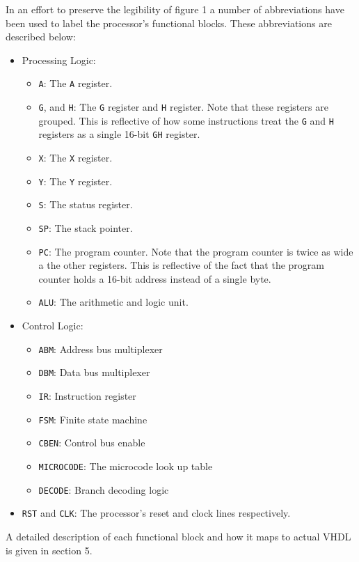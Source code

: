 \documentclass[a4paper,12pt]{article}
\newcommand{\Ar}{\texttt{A}}
\newcommand{\Gr}{\texttt{G}}
\newcommand{\Hr}{\texttt{H}}
\newcommand{\Xr}{\texttt{X}}
\newcommand{\Yr}{\texttt{Y}}
\newcommand{\Sr}{\texttt{S}}
\newcommand{\SP}{\texttt{SP}}
\newcommand{\PC}{\texttt{PC}}
\begin{document}
In an effort to preserve the legibility of figure 1 a number of abbreviations
have been used to label the processor's functional blocks. These abbreviations
are described below:
\begin{itemize}
	\item Processing Logic:
	\begin{itemize}
		\item \Ar{}: The \Ar{} register.
		\item \Gr{}, and \Hr{}: The \Gr{} register and \Hr{} register. 
		Note that these registers are grouped. This is reflective of how
		some instructions treat the \Gr{} and \Hr{} registers as a 
		single 16-bit \Gr{}\Hr{} register.
		\item \Xr{}: The \Xr{} register.
		\item \Yr{}: The \Yr{} register.
		\item \Sr{}: The status register.
		\item \SP{}: The stack pointer.
		\item \PC{}: The program counter. Note that the program counter
		is twice as wide a the other registers. This is reflective of 
		the fact that the program counter holds a 16-bit address instead
		of a single byte.
		\item \texttt{ALU}: The arithmetic and logic unit.
	\end{itemize}
	\item Control Logic:
	\begin{itemize}
		\item \texttt{ABM}: Address bus multiplexer
		\item \texttt{DBM}: Data bus multiplexer
		\item \texttt{IR}: Instruction register
		\item \texttt{FSM}: Finite state machine
		\item \texttt{CBEN}: Control bus enable
		\item \texttt{MICROCODE}: The microcode look up table
		\item \texttt{DECODE}: Branch decoding logic
	\end{itemize}
	\item \texttt{RST} and \texttt{CLK}: The processor's reset and clock 
	lines respectively.
\end{itemize}
A detailed description of each functional block and how it maps to actual VHDL 
is given in section 5.
\par
\end{document}

